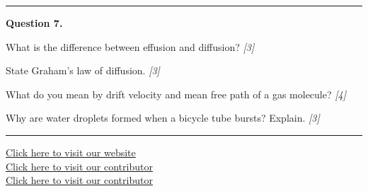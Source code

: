 \documentclass[11pt,a4paper]{article}
\newcommand{\pts}[1]{\hfill   \textit{[#1]}}
\begin{document}
\medskip\rule{\linewidth}{0.2pt}




\noindent   \textbf{Question 7.}

\begin{parts}
  \item What is the difference between effusion and diffusion? \pts{3}
  \item State Graham's law of diffusion. \pts{3}
  \item What do you mean by drift velocity and mean free path of a gas molecule? \pts{4}
  \item Why are water droplets formed when a bicycle tube bursts? Explain. \pts{3}
\end{parts}

\vfill
\rule{\linewidth}{0.4pt}

\begin{center}\small
  \href{https://bhu-exam.vercel.app/}{Click here to visit our website}\\[4pt]
  \href{https://me-aryan.vercel.app/}{Click here to visit our contributor}\\[4pt]
  \href{https://quashan-me.vercel.app/}{Click here to visit our contributor}
\end{center}
\end{document}
